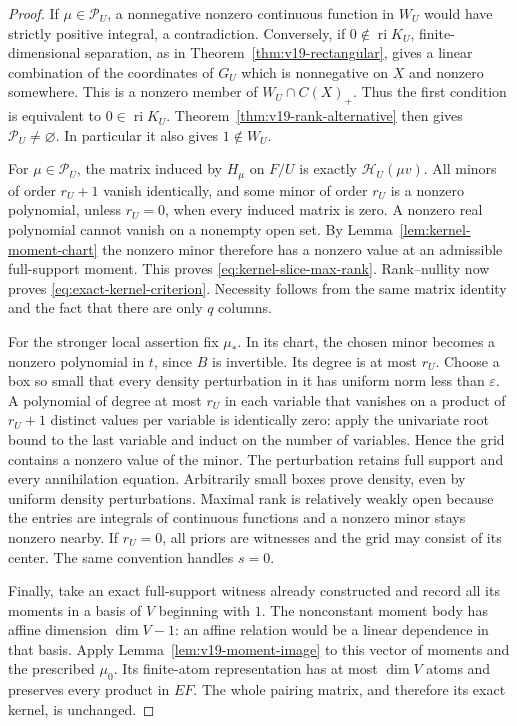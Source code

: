 \documentclass[11pt]{amsart}
\theoremstyle{definition}\newtheorem{definition}[theorem]{Definition}
\theoremstyle{remark}\newtheorem{remark}[theorem]{Remark}
\begin{document}
\begin{proof}
If $\mu\in\mathcal P_U$, a nonnegative nonzero continuous function
in $W_U$ would have strictly positive integral, a contradiction.
Conversely, if $0\notin\operatorname{ri}K_U$, finite-dimensional
separation, as in Theorem~\ref{thm:v19-rectangular}, gives a linear
combination of the coordinates of $G_U$ which is nonnegative on $X$
and nonzero somewhere. This is a nonzero member of $W_U\cap C(X)_+$.
Thus the first condition is equivalent to $0\in\operatorname{ri}K_U$.
Theorem~\ref{thm:v19-rank-alternative} then gives $\mathcal P_U\ne
\varnothing$. In particular it also gives $1\notin W_U$.

For $\mu\in\mathcal P_U$, the matrix induced by $H_\mu$ on $F/U$
is exactly $\mathscr H_U(\mu v)$. All minors of order $r_U+1$
vanish identically, and some minor of order $r_U$ is a nonzero
polynomial, unless $r_U=0$, when every induced matrix is zero.
A nonzero real polynomial cannot vanish on a nonempty open set. By
Lemma~\ref{lem:kernel-moment-chart} the nonzero minor therefore has a
nonzero value at an admissible full-support moment. This proves
\eqref{eq:kernel-slice-max-rank}. Rank--nullity now proves
\eqref{eq:exact-kernel-criterion}. Necessity follows from the same
matrix identity and the fact that there are only $q$ columns.

For the stronger local assertion fix $\mu_*$. In its chart, the chosen
minor becomes a nonzero polynomial in $t$, since $B$ is invertible.
Its degree is at most $r_U$. Choose a box so small that every density
perturbation in it has uniform norm less than $\varepsilon$. A
polynomial of degree at most $r_U$ in each variable that vanishes on a
product of $r_U+1$ distinct values per variable is identically zero:
apply the univariate root bound to the last variable and induct on the
number of variables. Hence the grid contains a nonzero value of the
minor. The perturbation retains full support and every annihilation
equation. Arbitrarily small boxes prove density, even by uniform density
perturbations. Maximal rank is relatively weakly open because the
entries are integrals of continuous functions and a nonzero minor stays
nonzero nearby. If $r_U=0$, all priors are witnesses and the grid may
consist of its center. The same convention handles $s=0$.

Finally, take an exact full-support witness already constructed and
record all its moments in a basis of $V$ beginning with $1$. The
nonconstant moment body has affine dimension $\dim V-1$: an affine
relation would be a linear dependence in that basis. Apply
Lemma~\ref{lem:v19-moment-image} to this vector of moments and the
prescribed $\mu_0$. Its finite-atom representation has at most $\dim V$
atoms and preserves every product in $EF$. The whole pairing matrix,
and therefore its exact kernel, is unchanged.
\end{proof}
\end{document}
